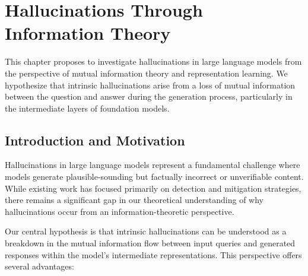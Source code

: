 \chapter{Hallucinations Through Information Theory}
\label{chp:hallucinations}

This chapter proposes to investigate hallucinations in large language models from the perspective of mutual information theory and representation learning. We hypothesize that intrinsic hallucinations arise from a loss of mutual information between the question and answer during the generation process, particularly in the intermediate layers of foundation models.

\section{Introduction and Motivation}
\label{sec:hall_intro}

Hallucinations in large language models represent a fundamental challenge where models generate plausible-sounding but factually incorrect or unverifiable content. While existing work has focused primarily on detection and mitigation strategies, there remains a significant gap in our theoretical understanding of why hallucinations occur from an information-theoretic perspective.

Our central hypothesis is that intrinsic hallucinations can be understood as a breakdown in the mutual information flow between input queries and generated responses within the model's intermediate representations. This perspective offers several advantages:

